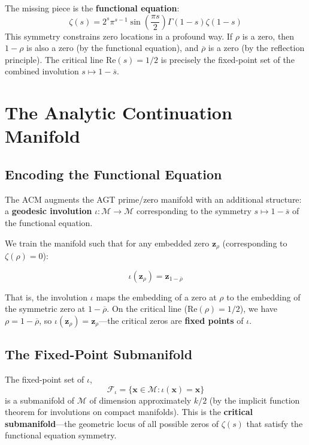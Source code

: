 \documentclass{article}
\begin{document}
The missing piece is the \textbf{functional equation}:
\begin{equation}
\zeta(s) = 2^s \pi^{s-1} \sin\left(\frac{\pi s}{2}\right) \Gamma(1-s) \zeta(1-s)
\end{equation}
This symmetry constrains zero locations in a profound way.  If $\rho$ is a zero,
then $1-\rho$ is also a zero (by the functional equation), and
$\overline{\rho}$ is a zero (by the reflection principle).  The critical line
$\mathrm{Re}(s) = 1/2$ is precisely the fixed-point set of the combined
involution $s \mapsto 1 - \overline{s}$.

\section{The Analytic Continuation Manifold}
\label{sec:acm}

\subsection{Encoding the Functional Equation}

The ACM augments the AGT prime/zero manifold with an additional structure:
a \textbf{geodesic involution} $\iota: \mathcal{M} \to \mathcal{M}$ corresponding
to the symmetry $s \mapsto 1 - \overline{s}$ of the functional equation.

We train the manifold such that for any embedded zero $\mathbf{z}_\rho$
(corresponding to $\zeta(\rho) = 0$):

\begin{equation}
\iota(\mathbf{z}_\rho) = \mathbf{z}_{1-\overline{\rho}}
\end{equation}

That is, the involution $\iota$ maps the embedding of a zero at $\rho$ to the
embedding of the symmetric zero at $1 - \overline{\rho}$.  On the critical line
($\mathrm{Re}(\rho) = 1/2$), we have $\rho = 1 - \overline{\rho}$, so
$\iota(\mathbf{z}_\rho) = \mathbf{z}_\rho$---the critical zeros are
\textbf{fixed points} of $\iota$.

\subsection{The Fixed-Point Submanifold}

The fixed-point set of $\iota$,
\begin{equation}
\mathcal{F}_\iota = \{\mathbf{x} \in \mathcal{M} : \iota(\mathbf{x}) = \mathbf{x}\}
\end{equation}
is a submanifold of $\mathcal{M}$ of dimension approximately $k/2$ (by the
implicit function theorem for involutions on compact manifolds).  This is the
\textbf{critical submanifold}---the geometric locus of all possible zeros of
$\zeta(s)$ that satisfy the functional equation symmetry.
\end{document}
